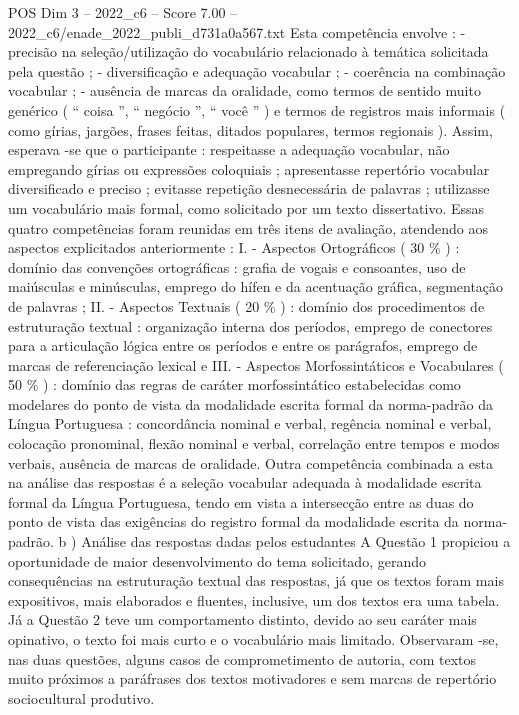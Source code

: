 \begin{textsample}{POS Dim 3 – 2022\_c6 – Score 7.00 – 2022\_c6/enade\_2022\_publi\_d731a0a567.txt}
Esta competência envolve : - precisão na seleção/utilização do vocabulário relacionado à temática solicitada pela questão ; - diversificação e adequação vocabular ; - coerência na combinação vocabular ; - ausência de marcas da oralidade, como termos de sentido muito genérico ( “ coisa ”, “ negócio ”, “ você ” ) e termos de registros mais informais ( como gírias, jargões, frases feitas, ditados populares, termos regionais ).
Assim, esperava -se que o participante : respeitasse a adequação vocabular, não empregando gírias ou expressões coloquiais ; apresentasse repertório vocabular diversificado e preciso ; evitasse repetição desnecessária de palavras ; utilizasse um vocabulário mais formal, como solicitado por um texto dissertativo.
Essas quatro competências foram reunidas em três itens de avaliação, atendendo aos aspectos explicitados anteriormente : I. - Aspectos Ortográficos ( 30 \% ) : domínio das convenções ortográficas : grafia de vogais e consoantes, uso de maiúsculas e minúsculas, emprego do hífen e da acentuação gráfica, segmentação de palavras ; II. - Aspectos Textuais ( 20 \% ) : domínio dos procedimentos de estruturação textual : organização interna dos períodos, emprego de conectores para a articulação lógica entre os períodos e entre os parágrafos, emprego de marcas de referenciação lexical e III. - Aspectos Morfossintáticos e Vocabulares ( 50 \% ) : domínio das regras de caráter morfossintático estabelecidas como modelares do ponto de vista da modalidade escrita formal da norma-padrão da Língua Portuguesa : concordância nominal e verbal, regência nominal e verbal, colocação pronominal, flexão nominal e verbal, correlação entre tempos e modos verbais, ausência de marcas de oralidade.
Outra competência combinada a esta na análise das respostas é a seleção vocabular adequada à modalidade escrita formal da Língua Portuguesa, tendo em vista a intersecção entre as duas do ponto de vista das exigências do registro formal da modalidade escrita da norma-padrão. b ) Análise das respostas dadas pelos estudantes A Questão 1 propiciou a oportunidade de maior desenvolvimento do tema solicitado, gerando consequências na estruturação textual das respostas, já que os textos foram mais expositivos, mais elaborados e fluentes, inclusive, um dos textos era uma tabela.
Já a Questão 2 teve um comportamento distinto, devido ao seu caráter mais opinativo, o texto foi mais curto e o vocabulário mais limitado.
Observaram -se, nas duas questões, alguns casos de comprometimento de autoria, com textos muito próximos a paráfrases dos textos motivadores e sem marcas de repertório sociocultural produtivo.

\end{textsample}
